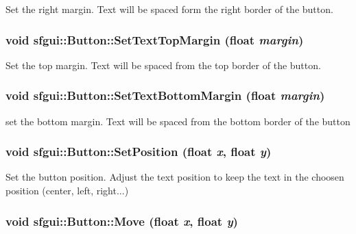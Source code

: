 Set the right margin. Text will be spaced form the right border of the button. \hypertarget{classsfgui_1_1Button_cd571ac750ad4f9f957da40fb1ae23d7}{
\subsubsection[SetTextTopMargin]{\setlength{\rightskip}{0pt plus 5cm}void sfgui::Button::SetTextTopMargin (float {\em margin})}}
\label{classsfgui_1_1Button_cd571ac750ad4f9f957da40fb1ae23d7}




Set the top margin. Text will be spaced from the top border of the button. \hypertarget{classsfgui_1_1Button_18a553fdcfbcf42d7764d3e039a72708}{
\subsubsection[SetTextBottomMargin]{\setlength{\rightskip}{0pt plus 5cm}void sfgui::Button::SetTextBottomMargin (float {\em margin})}}
\label{classsfgui_1_1Button_18a553fdcfbcf42d7764d3e039a72708}




set the bottom margin. Text will be spaced from the bottom border of the button \hypertarget{classsfgui_1_1Button_4160a1abdec76e06db9b34b80f5fa12c}{
\subsubsection[SetPosition]{\setlength{\rightskip}{0pt plus 5cm}void sfgui::Button::SetPosition (float {\em x}, \/  float {\em y})}}
\label{classsfgui_1_1Button_4160a1abdec76e06db9b34b80f5fa12c}




Set the button position. Adjust the text position to keep the text in the choosen position (center, left, right...) \hypertarget{classsfgui_1_1Button_be36461c2e85c67b6cc42f3a6cba0468}{
\subsubsection[Move]{\setlength{\rightskip}{0pt plus 5cm}void sfgui::Button::Move (float {\em x}, \/  float {\em y})}}
\label{classsfgui_1_1Button_be36461c2e85c67b6cc42f3a6cba0468}




